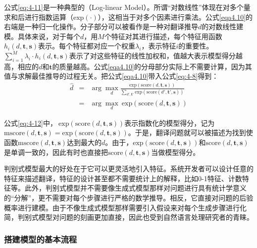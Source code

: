 \parinterval 公式\ref{eq:4-11}是一种典型的{\small{}}（Log-linear Model）。所谓``对数线性''体现在对多个量求和后进行指数运算（$\textrm{exp}(\cdot)$），这相当于对多个因素进行乘法。公式\ref{eqa4.10}的右端是一种归一化操作。分子部分可以被看作是一种对翻译推导$d$的对数线性建模。具体来说，对于每个$d$，用$M$个特征对其进行描述，每个特征用函数$h_i (d,\mathbf{t},\mathbf{s})$表示。每个特征都对应一个权重$\lambda_i$，表示特征$i$的重要性。$\sum_{i=1}^{M} \lambda_i \cdot h_i (d,\mathbf{t},\mathbf{s})$表示了对这些特征的线性加权和，值越大表示模型得分越高，相应的$d$和$\mathbf{t}$的质量越高。公式\ref{eqa4.10}的分母部分实际上不需要计算，因为其值与求解最佳推导的过程无关。把公式\ref{eqa4.10}带入公式\ref{eq:4-8}得到：
\begin{eqnarray}
\hat{d} &=& \arg\max_{d} \frac{\textrm{exp}(\textrm{score}(d,\mathbf{t},\mathbf{s}))}{\sum_{d',\mathbf{t}'} \textrm{exp}(\textrm{score}(d',\mathbf{t}',\mathbf{s}))} \nonumber \\
&=& \arg\max_{d}\ \textrm{exp}(\textrm{score}(d,\mathbf{t},\mathbf{s}))
\label{eq:4-12}
\end{eqnarray}

\parinterval 公式\ref{eq:4-12}中，$\ \textrm{exp}(\textrm{score}(d,\mathbf{t},\mathbf{s}))$表示指数化的模型得分，记为$\textrm{mscore}(d,\mathbf{t},\mathbf{s}) = \textrm{exp}(\textrm{score}(d,\mathbf{t},\mathbf{s}))$。于是，翻译问题就可以被描述为找到使函数$\textrm{mscore}(d,\mathbf{t},\mathbf{s})$达到最大的$d$。由于，$\textrm{exp}(\textrm{score}(d,\mathbf{t},\mathbf{s}))$和$\textrm{score}(d,\mathbf{t},\mathbf{s})$是单调一致的，因此有时也直接把$\textrm{score}(d,\mathbf{t},\mathbf{s})$当做模型得分。

\parinterval 判别式模型最大的好处在于它可以更灵活地引入特征。系统开发者可以设计任意的特征来描述翻译，特征的设计甚至都不需要统计上的解释，比如0-1特征、计数特征等。此外，判别式模型并不需要像生成式模型那样对问题进行具有统计学意义的``分解''，更不需要对每个步骤进行严格的数学推导。相反，它直接对问题的后验概率进行建模。由于不像生成式模型那样需要引入假设来对每个生成步骤进行化简，判别式模型对问题的刻画更加直接，因此也受到自然语言处理研究者的青睐。


\subsubsection{搭建模型的基本流程}

